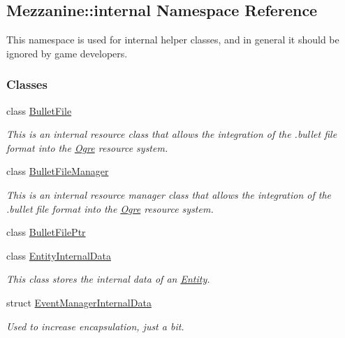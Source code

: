 \hypertarget{namespaceMezzanine_1_1internal}{
\subsection{Mezzanine::internal Namespace Reference}
\label{namespaceMezzanine_1_1internal}
}


This namespace is used for internal helper classes, and in general it should be ignored by game developers.  


\subsubsection*{Classes}
\begin{DoxyCompactItemize}
\item 
class \hyperlink{classMezzanine_1_1internal_1_1BulletFile}{BulletFile}
\begin{DoxyCompactList}\small\item\em This is an internal resource class that allows the integration of the .bullet file format into the \hyperlink{namespaceOgre}{Ogre} resource system. \item\end{DoxyCompactList}\item 
class \hyperlink{classMezzanine_1_1internal_1_1BulletFileManager}{BulletFileManager}
\begin{DoxyCompactList}\small\item\em This is an internal resource manager class that allows the integration of the .bullet file format into the \hyperlink{namespaceOgre}{Ogre} resource system. \item\end{DoxyCompactList}\item 
class \hyperlink{classMezzanine_1_1internal_1_1BulletFilePtr}{BulletFilePtr}
\item 
class \hyperlink{structMezzanine_1_1internal_1_1EntityInternalData}{EntityInternalData}
\begin{DoxyCompactList}\small\item\em This class stores the internal data of an \hyperlink{classMezzanine_1_1Entity}{Entity}. \item\end{DoxyCompactList}\item 
struct \hyperlink{structMezzanine_1_1internal_1_1EventManagerInternalData}{EventManagerInternalData}
\begin{DoxyCompactList}\small\item\em Used to increase encapsulation, just a bit. \item\end{DoxyCompactList}\item 

\end{DoxyCompactItemize}
